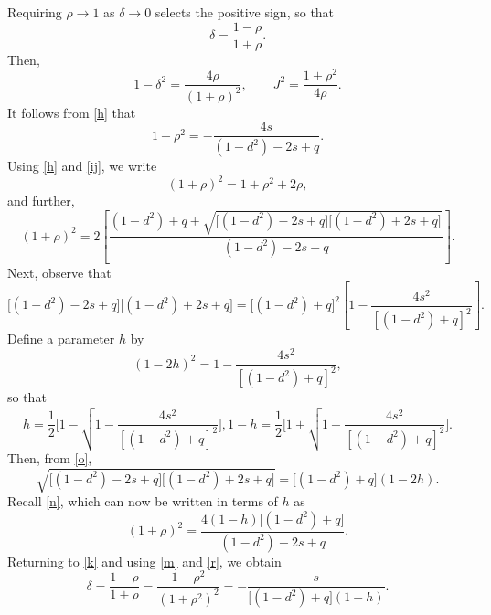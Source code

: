\documentclass[12pt,oneside]{report}
\theoremstyle{definition}
\begin{document}
Requiring \(\rho \to 1\) as \(\delta \to 0\) selects the positive sign, so that
\begin{equation}\label{k}
\delta = \frac{1-\rho}{1+\rho}.
\end{equation}
Then,
\begin{equation}\label{l}
1-\delta^{2} = \frac{4\rho}{(1+\rho)^{2}}, \qquad J^{2} = \frac{1+\rho^{2}}{4\rho}.
\end{equation}
It follows from \autoref{h} that
\begin{equation}\label{m}
1-\rho^{2} = -\frac{4s}{(1-d^{2})-2s+q}.
\end{equation}
Using \autoref{h} and \autoref{ij}, we write
\[
(1+\rho)^{2} = 1+\rho^{2}+2\rho,
\]
and further,
\begin{equation}\label{n}
(1+\rho)^{2} = 2 \left[ \frac{(1-d^{2})+q + \sqrt{\bigl[(1-d^{2})-2s+q\bigr]\bigl[(1-d^{2})+2s+q\bigr]}}{(1-d^{2})-2s+q} \right].
\end{equation}
Next, observe that
\begin{equation}\label{o}
\bigl[(1-d^{2})-2s+q\bigr]\bigl[(1-d^{2})+2s+q\bigr] = \bigl[(1-d^{2})+q\bigr]^{2}\left[1-\frac{4s^{2}}{[(1-d^{2})+q]^{2}}\right].
\end{equation}
Define a parameter \(h\) by
\begin{equation}\label{p}
(1-2h)^{2} = 1 - \frac{4s^{2}}{[(1-d^{2})+q]^{2}},
\end{equation}
so that
\begin{subequations}
    \begin{equation}\label{hcoeff1}
    h = \frac{1}{2}\Biggl[1 - \sqrt{1 - \frac{4s^{2}}{[(1-d^{2})+q]^{2}}}\Biggr],
    \end{equation}
    \begin{equation}\label{hcoeff2}
    1-h = \frac{1}{2}\Biggl[1 + \sqrt{1 - \frac{4s^{2}}{[(1-d^{2})+q]^{2}}}\Biggr].
    \end{equation}
\end{subequations}
Then, from \autoref{o},
\begin{equation}\label{q}
\sqrt{\bigl[(1-d^{2})-2s+q\bigr]\bigl[(1-d^{2})+2s+q\bigr]} = \bigl[(1-d^{2})+q\bigr](1-2h).
\end{equation}
Recall \autoref{n}, which can now be written in terms of \(h\) as
\begin{equation}\label{r}
(1+\rho)^{2} = \frac{4(1-h)\bigl[(1-d^{2})+q\bigr]}{(1-d^{2})-2s+q}.
\end{equation}
Returning to \autoref{k} and using \autoref{m} and \autoref{r}, we obtain
\begin{equation}\label{7.5}
\delta = \frac{1-\rho}{1+\rho} = \frac{1-\rho^{2}}{(1+\rho^{2})^{2}} = -\frac{s}{\bigl[(1-d^{2})+q\bigr](1-h)}.
\end{equation}
\end{document}

